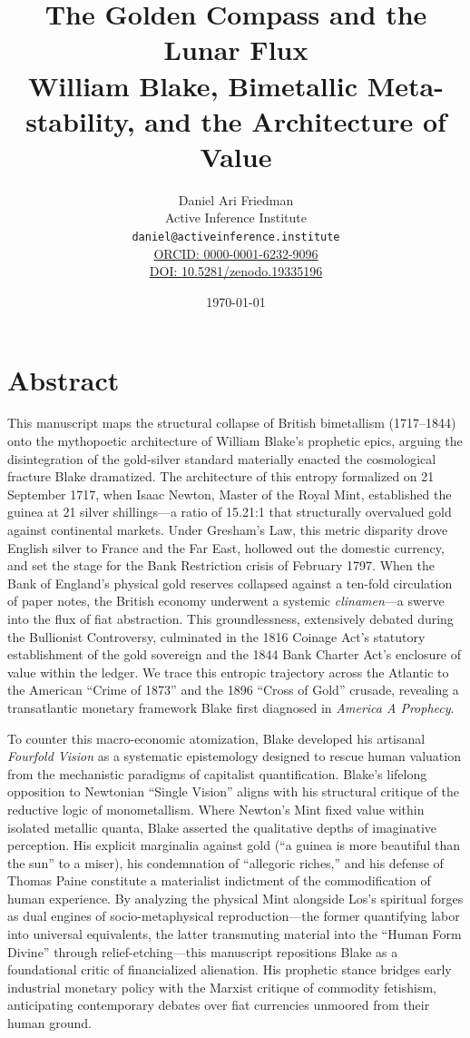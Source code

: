 \documentclass[
]{article}
\author{}
\date{}
\title{The Golden Compass and the Lunar Flux\\\normalsize William Blake, Bimetallic Meta-stability, and the Architecture of Value}
\author{Daniel Ari Friedman\\\footnotesize{Active Inference Institute}\\\footnotesize{\texttt{daniel@activeinference.institute}}\\\footnotesize{\href{https://orcid.org/0000-0001-6232-9096}{ORCID: 0000-0001-6232-9096}} \\ \footnotesize{\href{https://doi.org/10.5281/zenodo.19335196}{DOI: 10.5281/zenodo.19335196}}}
\date{\today}
\begin{document}
\maketitle
\thispagestyle{empty}
\tableofcontents
\newpage


\section{Abstract}\label{abstract}

This manuscript maps the structural collapse of British bimetallism
(1717--1844) onto the mythopoetic architecture of William Blake's
prophetic epics, arguing the disintegration of the gold-silver standard
materially enacted the cosmological fracture Blake dramatized. The
architecture of this entropy formalized on 21 September 1717, when Isaac
Newton, Master of the Royal Mint, established the guinea at 21 silver
shillings---a ratio of 15.21:1 that structurally overvalued gold against
continental markets. Under Gresham's Law, this metric disparity drove
English silver to France and the Far East, hollowed out the domestic
currency, and set the stage for the Bank Restriction crisis of February
1797. When the Bank of England's physical gold reserves collapsed
against a ten-fold circulation of paper notes, the British economy
underwent a systemic \emph{clinamen}---a swerve into the flux of fiat
abstraction. This groundlessness, extensively debated during the
Bullionist Controversy, culminated in the 1816 Coinage Act's statutory
establishment of the gold sovereign and the 1844 Bank Charter Act's
enclosure of value within the ledger. We trace this entropic trajectory
across the Atlantic to the American ``Crime of 1873'' and the 1896
``Cross of Gold'' crusade, revealing a transatlantic monetary framework
Blake first diagnosed in \emph{America A Prophecy}.

To counter this macro-economic atomization, Blake developed his
artisanal \emph{Fourfold Vision} as a systematic epistemology designed
to rescue human valuation from the mechanistic paradigms of capitalist
quantification. Blake's lifelong opposition to Newtonian ``Single
Vision'' aligns with his structural critique of the reductive logic of
monometallism. Where Newton's Mint fixed value within isolated metallic
quanta, Blake asserted the qualitative depths of imaginative perception.
His explicit marginalia against gold (``a guinea is more beautiful than
the sun'' to a miser), his condemnation of ``allegoric riches,'' and his
defense of Thomas Paine constitute a materialist indictment of the
commodification of human experience. By analyzing the physical Mint
alongside Los's spiritual forges as dual engines of socio-metaphysical
reproduction---the former quantifying labor into universal equivalents,
the latter transmuting material into the ``Human Form Divine'' through
relief-etching---this manuscript repositions Blake as a foundational
critic of financialized alienation. His prophetic stance bridges early
industrial monetary policy with the Marxist critique of commodity
fetishism, anticipating contemporary debates over fiat currencies
unmoored from their human ground.
\end{document}

